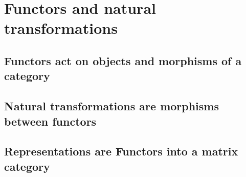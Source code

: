 
\section{Functors and natural transformations}

\subsection{Functors act on objects and morphisms of a category}

\subsection{Natural transformations are morphisms between functors}

\subsection{Representations are Functors into a matrix category}